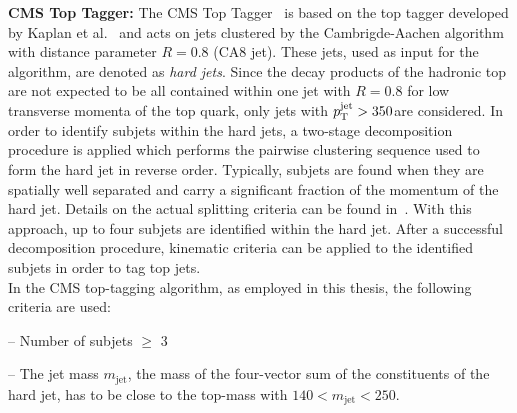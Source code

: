 \begin{description}
 \item \textbf{CMS Top Tagger:} The CMS Top Tagger~\cite{CMS-PAS-JME-09-001} is based on the top tagger developed by Kaplan et al.~\cite{Kaplan:2008ie} and acts on jets clustered by the Cambrigde-Aachen algorithm with distance parameter $R = 0.8$ (CA8 jet). These jets, used as input for the algorithm, are denoted as \textit{hard jets}. Since the decay products of the hadronic top are not expected to be all contained within one jet with $R = 0.8$ for low transverse momenta of the top quark, only jets with $p_{\text{T}}^\mathrm{jet} > 350$\gev are considered. In order to identify subjets within the hard jets, a two-stage decomposition procedure is applied which performs the pairwise clustering sequence used to form the hard jet in reverse order. %
Typically, subjets are found when they are spatially well separated and carry a significant fraction of the momentum of the hard jet. Details on the actual splitting criteria can be found in~\cite{CMS-PAS-JME-13-007}. With this approach, up to four subjets are identified within the hard jet. After a successful decomposition procedure, kinematic criteria can be applied to the identified subjets in order to tag top jets. \\
In the CMS top-tagging algorithm, as employed in this thesis, the following criteria are used:
\begin{description}
 \item -- Number of subjets $\ge$ 3
 \item -- The jet mass $m_{\mathrm{jet}}$, \ie the mass of the four-vector sum of the constituents of the hard jet, has to be close to the top-mass with $140 < m_{\mathrm{jet}} < 250$\gev.

\end{description}
\end{description}
